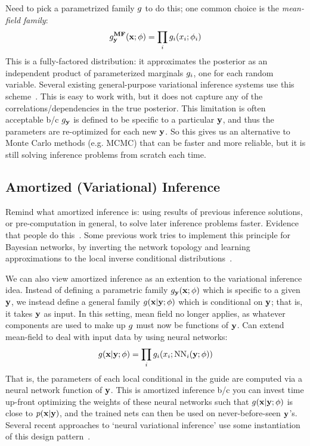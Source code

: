 Need to pick a parametrized family $g$ to do this; one common choice is the \emph{mean-field family}:
\begin{equation*}
g^{\textbf{MF}}_{\mathbf{y}}(\mathbf{x} ; \phi) = \prod_i g_i(x_i ; \phi_i)
\end{equation*}
This is a fully-factored distribution: it approximates the posterior as an independent product of parameterized marginals $g_i$, one for each random variable.
Several existing general-purpose variational inference systems use this scheme~\cite{AVIPP,BBVI}.
This is easy to work with, but it does not capture any of the correlations/dependencies in the true posterior.
This limitation is often acceptable b/c $g_{\mathbf{y}}$ is defined to be specific to a particular $\mathbf{y}$, and thus the parameters are re-optimized for each new $\mathbf{y}$.
So this gives us an alternative to Monte Carlo methods (e.g. MCMC) that can be faster and more reliable, but it is still solving inference problems from scratch each time.

\subsection{Amortized (Variational) Inference}

Remind what amortized inference is: using results of previous inference solutions, or pre-computation in general, to solve later inference problems faster.
Evidence that people do this~\cite{AmortizedInference}.
Some previous work tries to implement this principle for Bayesian networks, by inverting the network topology and learning approximations to the local inverse conditional distributions~\cite{StochasticInverses,NeuralStochasticInverses}.

We can also view amortized inference as an extention to the variational inference idea.
Instead of defining a parametric family $g_{\mathbf{y}}(\mathbf{x} ; \phi)$ which is specific to a given $\mathbf{y}$, we instead define a general family $g(\mathbf{x} | \mathbf{y} ; \phi)$ which is conditional on $\mathbf{y}$; that is, it takes $\mathbf{y}$ as input.
In this setting, mean field no longer applies, as whatever components are used to make up $g$ must now be functions of $\mathbf{y}$.
Can extend mean-field to deal with input data by using neural networks:
\begin{equation*}
g(\mathbf{x} | \mathbf{y} ; \phi) = \prod_i g_i(x_i ; \text{NN}_i(\mathbf{y} ; \phi))
\end{equation*}
That is, the parameters of each local conditional in the guide are computed via a neural network function of $\mathbf{y}$.
This is amortized inference b/c you can invest time up-front optimizing the weights of these neural networks such that $g(\mathbf{x} | \mathbf{y} ; \phi)$ is close to $p(\mathbf{x} | \mathbf{y})$, and the trained nets can then be used on never-before-seen $\mathbf{y}$'s.
Several recent approaches to `neural variational inference' use some instantiation of this design pattern~\cite{NVIL,DLGM,AEVB}.

